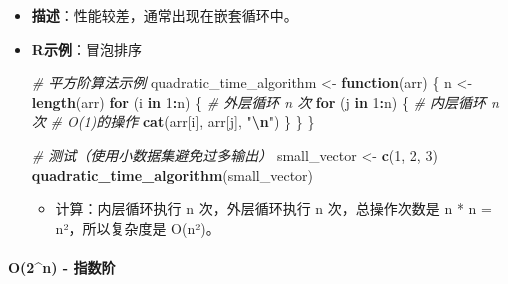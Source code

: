 \documentclass[
]{book}
\newenvironment{Shaded}{\begin{snugshade}}{\end{snugshade}}
\newcommand{\CommentTok}[1]{\textcolor[rgb]{0.56,0.35,0.01}{\textit{#1}}}
\newcommand{\ControlFlowTok}[1]{\textcolor[rgb]{0.13,0.29,0.53}{\textbf{#1}}}
\newcommand{\DecValTok}[1]{\textcolor[rgb]{0.00,0.00,0.81}{#1}}
\newcommand{\FunctionTok}[1]{\textcolor[rgb]{0.13,0.29,0.53}{\textbf{#1}}}
\newcommand{\NormalTok}[1]{#1}
\newcommand{\OtherTok}[1]{\textcolor[rgb]{0.56,0.35,0.01}{#1}}
\newcommand{\SpecialCharTok}[1]{\textcolor[rgb]{0.81,0.36,0.00}{\textbf{#1}}}
\newcommand{\StringTok}[1]{\textcolor[rgb]{0.31,0.60,0.02}{#1}}
\providecommand{\tightlist}{%
  \setlength{\itemsep}{0pt}\setlength{\parskip}{0pt}}
\begin{document}
\begin{itemize}
\item
  \textbf{描述}：性能较差，通常出现在嵌套循环中。
\item
  \textbf{R示例}：冒泡排序

\begin{Shaded}
\begin{Highlighting}[]
\CommentTok{\# 平方阶算法示例}
\NormalTok{quadratic\_time\_algorithm }\OtherTok{\textless{}{-}} \ControlFlowTok{function}\NormalTok{(arr) \{}
\NormalTok{  n }\OtherTok{\textless{}{-}} \FunctionTok{length}\NormalTok{(arr)}
  \ControlFlowTok{for}\NormalTok{ (i }\ControlFlowTok{in} \DecValTok{1}\SpecialCharTok{:}\NormalTok{n) \{        }\CommentTok{\# 外层循环 n 次}
    \ControlFlowTok{for}\NormalTok{ (j }\ControlFlowTok{in} \DecValTok{1}\SpecialCharTok{:}\NormalTok{n) \{      }\CommentTok{\# 内层循环 n 次}
      \CommentTok{\# O(1)的操作}
      \FunctionTok{cat}\NormalTok{(arr[i], arr[j], }\StringTok{"}\SpecialCharTok{\textbackslash{}n}\StringTok{"}\NormalTok{)}
\NormalTok{    \}}
\NormalTok{  \}}
\NormalTok{\}}

\CommentTok{\# 测试（使用小数据集避免过多输出）}
\NormalTok{small\_vector }\OtherTok{\textless{}{-}} \FunctionTok{c}\NormalTok{(}\DecValTok{1}\NormalTok{, }\DecValTok{2}\NormalTok{, }\DecValTok{3}\NormalTok{)}
\FunctionTok{quadratic\_time\_algorithm}\NormalTok{(small\_vector)}
\end{Highlighting}
\end{Shaded}

  \begin{itemize}
  \tightlist
  \item
    计算：内层循环执行 n 次，外层循环执行 n 次，总操作次数是 n * n = n²，所以复杂度是 O(n²)。
  \end{itemize}
\end{itemize}

\hypertarget{o2n---ux6307ux6570ux9636}{%
\paragraph{O(2\^{}n) - 指数阶}\label{o2n---ux6307ux6570ux9636}}
\end{document}
